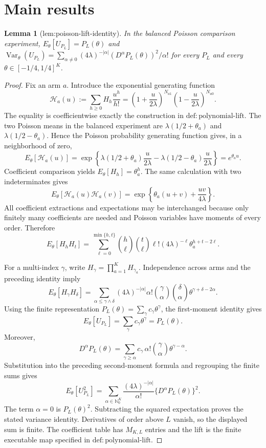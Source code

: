 \documentclass{article}
\newtheorem{lemma}{Lemma}
\begin{document}
\section{Main results}

\begin{lemma}[lem:poisson-lift-identity]\label{lem:poisson-lift-identity}
In the balanced Poisson comparison experiment, \(E_\theta[U_{P_L}]=P_L(\theta)\) and \(\operatorname{Var}_\theta(U_{P_L})=\sum_{\alpha\ne0}(4\lambda)^{-|\alpha|}(D^\alpha P_L(\theta))^2/\alpha!\) for every \(P_L\) and every \(\theta\in[-1/4,1/4]^K\).
\end{lemma}
\begin{proof}
Fix an arm \(a\).  Introduce the exponential generating function
\[
 \mathcal H_a(u):=\sum_{h\geq 0}H_h\frac{u^h}{h!}
 =\left(1+\frac{u}{2\lambda}\right)^{N_{a1}}
  \left(1-\frac{u}{2\lambda}\right)^{N_{a0}}.
\]
The equality is coefficientwise exactly the construction in \(\mathrm{def{:}polynomial\text{-}lift}\).  The two Poisson means in the balanced experiment are \(\lambda(1/2+\theta_a)\) and \(\lambda(1/2-\theta_a)\).  Hence the Poisson probability generating function gives, in a neighborhood of zero,
\[
 E_\theta[\mathcal H_a(u)]
 =\exp\!\left\{\lambda(1/2+\theta_a)\frac{u}{2\lambda}
                 -\lambda(1/2-\theta_a)\frac{u}{2\lambda}\right\}
 =e^{\theta_a u}.
\]
Coefficient comparison yields \(E_\theta[H_h]=\theta_a^h\).  The same calculation with two indeterminates gives
\[
 E_\theta[\mathcal H_a(u)\mathcal H_a(v)]
 =\exp\!\left\{\theta_a(u+v)+\frac{uv}{4\lambda}\right\}.
\]
All coefficient extractions and expectations may be interchanged because only finitely many coefficients are needed and Poisson variables have moments of every order.  Therefore
\[
 E_\theta[H_hH_t]
 =\sum_{\ell=0}^{\min\{h,t\}}
   \binom h\ell\binom t\ell\ell!(4\lambda)^{-\ell}
   \theta_a^{h+t-2\ell}.
\]

For a multi-index \(\gamma\), write \(H_\gamma=\prod_{a=1}^K H_{\gamma_a}\).  Independence across arms and the preceding identity imply
\[
 E_\theta[H_\gamma H_\delta]
 =\sum_{\alpha\leq\gamma\wedge\delta}
 (4\lambda)^{-|\alpha|}\alpha!
 \binom\gamma\alpha\binom\delta\alpha
 \theta^{\gamma+\delta-2\alpha}.
\]
Using the finite representation \(P_L(\theta)=\sum_\gamma c_\gamma\theta^\gamma\), the first-moment identity gives
\[
 E_\theta[U_{P_L}]=\sum_\gamma c_\gamma\theta^\gamma=P_L(\theta).
\]
Moreover,
\[
 D^\alpha P_L(\theta)
 =\sum_{\gamma\geq\alpha}c_\gamma\,\alpha!\binom\gamma\alpha
   \theta^{\gamma-\alpha}.
\]
Substitution into the preceding second-moment formula and regrouping the finite sums gives
\[
 E_\theta[U_{P_L}^2]
 =\sum_{\alpha\in\mathbb N_0^K}
   \frac{(4\lambda)^{-|\alpha|}}{\alpha!}
   \{D^\alpha P_L(\theta)\}^2.
\]
The term \(\alpha=0\) is \(P_L(\theta)^2\).  Subtracting the squared expectation proves the stated variance identity.  Derivatives of order above \(L\) vanish, so the displayed sum is finite.  The coefficient table has \(M_{K,L}\) entries and the lift is the finite executable map specified in \(\mathrm{def{:}polynomial\text{-}lift}\).
\end{proof}
\end{document}

